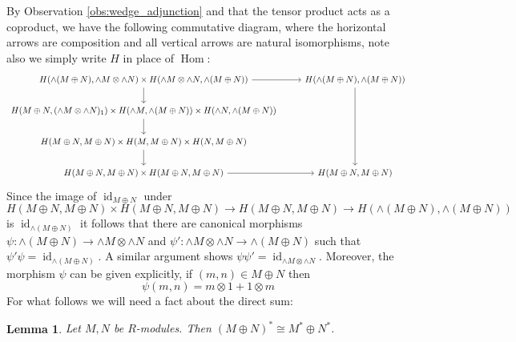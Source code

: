 \documentclass[12pt]{article}
\theoremstyle{plain}
\newtheorem{lemma}[thm]{Lemma}
\theoremstyle{definition}
\newcommand{\lto}{\longrightarrow}
\begin{document}
By Observation \ref{obs:wedge_adjunction} and that the tensor product acts as a coproduct, we have the following commutative diagram, where the horizontal arrows are composition and all vertical arrows are natural isomorphisms, note also we simply write $H$ in place of $\operatorname{Hom}$:
\begin{equation}
\begin{tikzcd}
H(\wedge(M \oplus N), \wedge M \otimes \wedge N) \times H(\wedge M \otimes \wedge N, \wedge(M \oplus N))\arrow[r]\arrow[d] & H(\wedge(M \oplus N), \wedge(M \oplus N))\arrow[ddd]\\
H(M \oplus N, (\wedge M \otimes \wedge N)_1) \times H(\wedge M, \wedge(M \oplus N)) \times H(\wedge N, \wedge(M \oplus N))\arrow[d]\\
H(M \oplus N, M \oplus N) \times H(M, M\oplus N) \times H(N, M \oplus N)\arrow[d]\\
H(M \oplus N, M \oplus N) \times H(M \oplus N, M \oplus N)\arrow[r] & H(M \oplus N, M \oplus N)
\end{tikzcd}
\end{equation}
Since the image of $\operatorname{id}_{M \oplus N}$ under
\begin{equation}
H(M \oplus N, M \oplus N) \times H(M \oplus N, M \oplus N)\lto H(M \oplus N, M \oplus N) \lto H(\wedge(M \oplus N), \wedge(M \oplus N))
\end{equation}
is $\operatorname{id}_{\wedge(M \oplus N)}$ it follows that there are canonical morphisms $\psi: \wedge(M \oplus N) \lto \wedge M \otimes \wedge N$ and $\psi': \wedge M \otimes \wedge N \lto \wedge (M \oplus N)$ such that $\psi' \psi = \operatorname{id}_{\wedge(M \oplus N)}$. A similar argument shows $\psi \psi' = \operatorname{id}_{\wedge M \otimes \wedge N}$. Moreover, the morphism $\psi$ can be given explicitly, if $(m,n) \in M \oplus N$ then
\begin{equation}
\psi(m, n) = m \otimes 1 + 1 \otimes m
\end{equation}
For what follows we will need a fact about the direct sum:
\begin{lemma}
Let $M,N$ be $R$-modules. Then $(M \oplus N)^\ast \cong M^\ast \oplus N^\ast$.
\end{lemma}
\end{document}

